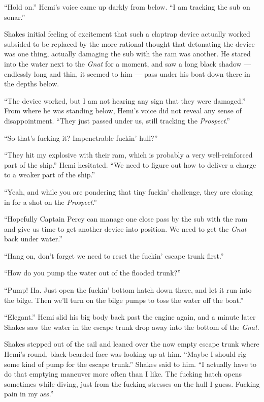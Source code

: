 \documentclass[
]{scrbook}
\begin{document}
``Hold on.'' Hemi's voice came up darkly from below. ``I am tracking the
sub on sonar.''

Shakes initial feeling of excitement that such a claptrap device
actually worked subsided to be replaced by the more rational thought
that detonating the device was one thing, actually damaging the sub with
the ram was another. He stared into the water next to the \emph{Gnat}
for a moment, and saw a long black shadow --- endlessly long and thin,
it seemed to him --- pass under his boat down there in the depths below.

``The device worked, but I am not hearing any sign that they were
damaged.'' From where he was standing below, Hemi's voice did not reveal
any sense of disappointment. ``They just passed under us, still tracking
the \emph{Prospect}.''

``So that's fucking it? Impenetrable fuckin' hull?''

``They hit my explosive with their ram, which is probably a very
well-reinforced part of the ship.'' Hemi hesitated. ``We need to figure
out how to deliver a charge to a weaker part of the ship.''

``Yeah, and while you are pondering that tiny fuckin' challenge, they
are closing in for a shot on the \emph{Prospect}.''

``Hopefully Captain Percy can manage one close pass by the sub with the
ram and give us time to get another device into position. We need to get
the \emph{Gnat} back under water.''

``Hang on, don't forget we need to reset the fuckin' escape trunk
first.''

``How do you pump the water out of the flooded trunk?''

``Pump! Ha. Just open the fuckin' bottom hatch down there, and let it
run into the bilge. Then we'll turn on the bilge pumps to toss the water
off the boat.''

``Elegant.'' Hemi slid his big body back past the engine again, and a
minute later Shakes saw the water in the escape trunk drop away into the
bottom of the \emph{Gnat}.

Shakes stepped out of the sail and leaned over the now empty escape
trunk where Hemi's round, black-bearded face was looking up at him.
``Maybe I should rig some kind of pump for the escape trunk.'' Shakes
said to him. ``I actually have to do that emptying maneuver more often
than I like. The fucking hatch opens sometimes while diving, just from
the fucking stresses on the hull I guess. Fucking pain in my ass.''
\end{document}
